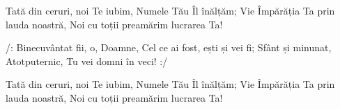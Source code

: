 \beginverse
Tată din ceruri, noi Te iubim,
Numele Tău Îl înălțăm;
Vie Împărăția Ta prin lauda noastră,
Noi cu toții preamărim lucrarea Ta!
\endverse

\beginchorus
/: Binecuvântat fii, o, Doamne,
Cel ce ai fost, ești și vei fi;
Sfânt și minunat, Atotputernic,
Tu vei domni în veci! :/
\endchorus

\beginverse
Tată din ceruri, noi Te iubim,
Numele Tău Îl înălțăm;
Vie Împărăția Ta prin lauda noastră,
Noi cu toții preamărim lucrarea Ta!
\endverse
\endsong